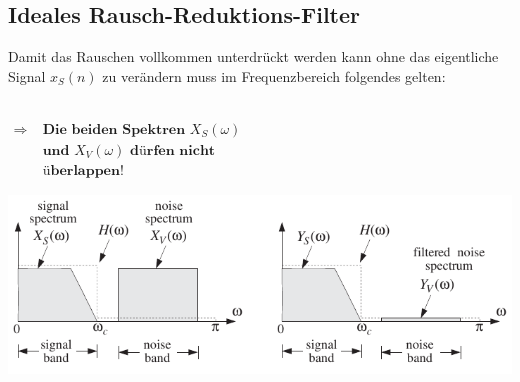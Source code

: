 	\subsection{Ideales Rausch-Reduktions-Filter}
		Damit das Rauschen vollkommen unterdrückt werden kann ohne das eigentliche Signal $x_S(n)$ zu verändern muss im Frequenzbereich folgendes gelten:\\
		\begin{minipage}{0.36\textwidth}
			\\[0.2cm]
			$\begin{array}{ll}\Rightarrow&\;\textbf{Die beiden Spektren $X_S(\omega)$}\\&\;\textbf{und $X_V(\omega)$ dürfen nicht}\\&\;\textbf{überlappen!}\end{array}$\\[0.2cm]
		\end{minipage}
		\begin{minipage}{0.67\textwidth}
		 \includegraphics[width = \textwidth]{pic/NoiseRedFilterIdeal.pdf}
		\end{minipage}

